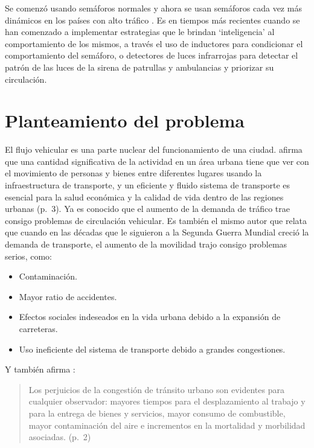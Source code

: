 Se comenzó usando semáforos normales y ahora se usan semáforos cada vez
más dinámicos en los países con alto tráfico . Es en tiempos más
recientes cuando se han comenzado a implementar estrategias que le
brindan `inteligencia' al comportamiento de los mismos, a través el uso
de inductores para condicionar el comportamiento del semáforo, o
detectores de luces infrarrojas para detectar el patrón de las luces de
la sirena de patrullas y ambulancias y priorizar su circulación.

\hypertarget{planteamiento-del-problema}{%
\section{Planteamiento del problema}\label{planteamiento-del-problema}}

El flujo vehicular es una parte nuclear del funcionamiento de una
ciudad. \parencite[3]{Patriksson2012} afirma que una cantidad
significativa de la actividad en un área urbana tiene que ver con el
movimiento de personas y bienes entre diferentes lugares usando la
infraestructura de transporte, y un eficiente y fluido sistema de
transporte es esencial para la salud económica y la calidad de vida
dentro de las regiones urbanas (p.~3). Ya es conocido que el aumento de
la demanda de tráfico trae consigo problemas de circulación vehicular.
Es también el mismo autor que relata que cuando en las décadas que le
siguieron a la Segunda Guerra Mundial creció la demanda de transporte,
el aumento de la movilidad trajo consigo problemas serios, como:

\begin{itemize}
\item
  Contaminación.
\item
  Mayor ratio de accidentes.
\item
  Efectos sociales indeseados en la vida urbana debido a la expansión de
  carreteras.
\item
  Uso ineficiente del sistema de transporte debido a grandes
  congestiones.
\end{itemize}

Y también afirma \parencite{Medina-Durango2011}:

\begin{quote}
Los perjuicios de la congestión de tránsito urbano son evidentes para
cualquier observador: mayores tiempos para el desplazamiento al trabajo
y para la entrega de bienes y servicios, mayor consumo de combustible,
mayor contaminación del aire e incrementos en la mortalidad y morbilidad
asociadas. (p.~2)
\end{quote}

